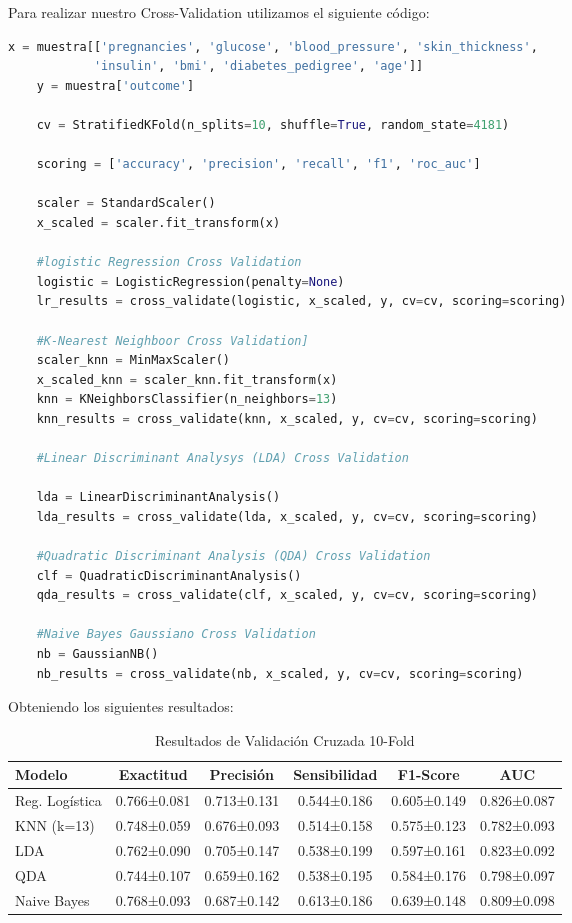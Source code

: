 \documentclass[12pt,a4paper]{article}
\begin{document}
Para realizar nuestro Cross-Validation utilizamos el siguiente código:

\begin{lstlisting}[language=Python, frame=single, basicstyle=\ttfamily\small, breaklines=true]
    x = muestra[['pregnancies', 'glucose', 'blood_pressure', 'skin_thickness',
            'insulin', 'bmi', 'diabetes_pedigree', 'age']]
    y = muestra['outcome']

    cv = StratifiedKFold(n_splits=10, shuffle=True, random_state=4181)  

    scoring = ['accuracy', 'precision', 'recall', 'f1', 'roc_auc']

    scaler = StandardScaler()
    x_scaled = scaler.fit_transform(x)

    #logistic Regression Cross Validation
    logistic = LogisticRegression(penalty=None)
    lr_results = cross_validate(logistic, x_scaled, y, cv=cv, scoring=scoring)

    #K-Nearest Neighboor Cross Validation]
    scaler_knn = MinMaxScaler()
    x_scaled_knn = scaler_knn.fit_transform(x)
    knn = KNeighborsClassifier(n_neighbors=13)
    knn_results = cross_validate(knn, x_scaled, y, cv=cv, scoring=scoring)

    #Linear Discriminant Analysys (LDA) Cross Validation

    lda = LinearDiscriminantAnalysis()
    lda_results = cross_validate(lda, x_scaled, y, cv=cv, scoring=scoring)  

    #Quadratic Discriminant Analysis (QDA) Cross Validation
    clf = QuadraticDiscriminantAnalysis()
    qda_results = cross_validate(clf, x_scaled, y, cv=cv, scoring=scoring)  

    #Naive Bayes Gaussiano Cross Validation
    nb = GaussianNB()
    nb_results = cross_validate(nb, x_scaled, y, cv=cv, scoring=scoring)    
\end{lstlisting}

\newpage

Obteniendo los siguientes resultados:

\begin{table}[H]
\centering
\caption{Resultados de Validación Cruzada 10-Fold}\label{tab:cross_validation}
\footnotesize
\begin{tabular}{lccccc}
\toprule
\textbf{Modelo} & \textbf{Exactitud} & \textbf{Precisión} & \textbf{Sensibilidad} & \textbf{F1-Score} & \textbf{AUC} \\
\midrule
Reg. Logística & 0.766±0.081 & 0.713±0.131 & 0.544±0.186 & 0.605±0.149 & 0.826±0.087 \\
KNN (k=13) & 0.748±0.059 & 0.676±0.093 & 0.514±0.158 & 0.575±0.123 & 0.782±0.093 \\
LDA & 0.762±0.090 & 0.705±0.147 & 0.538±0.199 & 0.597±0.161 & 0.823±0.092 \\
QDA & 0.744±0.107 & 0.659±0.162 & 0.538±0.195 & 0.584±0.176 & 0.798±0.097 \\
Naive Bayes & 0.768±0.093 & 0.687±0.142 & 0.613±0.186 & 0.639±0.148 & 0.809±0.098 \\
\bottomrule
\end{tabular}
\end{table}
\end{document}
